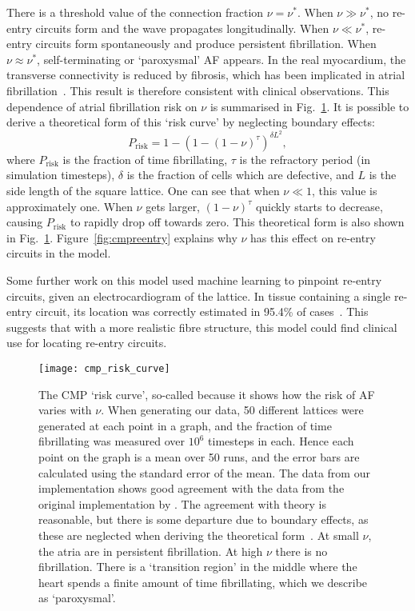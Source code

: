 There is a threshold value of the connection fraction $\nu = \nu^*$. When $\nu \gg \nu^*$, no re-entry circuits form and the wave propagates longitudinally. When $\nu \ll \nu^*$, re-entry circuits form spontaneously and produce persistent fibrillation. When $\nu \approx \nu^*$, self-terminating or `paroxysmal' AF appears. In the real myocardium, the transverse connectivity is reduced by fibrosis, which has been implicated in atrial fibrillation~\cite{de2011fibrosis}. This result is therefore consistent with clinical observations. This dependence of atrial fibrillation risk on $\nu$ is summarised in Fig.~\ref{fig:cmpriskcurve}. It is possible to derive a theoretical form of this `risk curve' by neglecting boundary effects:
\begin{equation}
    P_\mathrm{risk} = 1 - (1 - (1 - \nu)^\tau)^{\delta L^2},
\end{equation}
where $P_\mathrm{risk}$ is the fraction of time fibrillating, $\tau$ is the refractory period (in simulation timesteps), $\delta$ is the fraction of cells which are defective, and $L$ is the side length of the square lattice. One can see that when $\nu \ll 1$, this value is approximately one. When $\nu$ gets larger, $(1 - \nu)^\tau$ quickly starts to decrease, causing $P_\mathrm{risk}$ to rapidly drop off towards zero. This theoretical form is also shown in Fig.~\ref{fig:cmpriskcurve}. Figure~\ref{fig:cmpreentry} explains why $\nu$ has this effect on re-entry circuits in the model.

Some further work on this model used machine learning to pinpoint re-entry circuits, given an electrocardiogram of the lattice. In tissue containing a single re-entry circuit, its location was correctly estimated in 95.4\% of cases~\cite{mcgillivray2018machine}. This suggests that with a more realistic fibre structure, this model could find clinical use for locating re-entry circuits.

\begin{figure}[h!] \begin{mdframed}
    \centering
    \texttt{[image: cmp\_risk\_curve]}
    \caption[short caption]{The CMP `risk curve', so-called because it shows how the risk of AF varies with $\nu$. When generating our data, 50 different lattices were generated at each point in a graph, and the fraction of time fibrillating was measured over $10^6$ timesteps in each. Hence each point on the graph is a mean over 50 runs, and the error bars are calculated using the standard error of the mean. The data from our implementation shows good agreement with the data from the original implementation by . The agreement with theory is reasonable, but there is some departure due to boundary effects, as these are neglected when deriving the theoretical form~\cite{manani}. 
    At small $\nu$, the atria are in persistent fibrillation. At high $\nu$ there is no fibrillation. There is a `transition region' in the middle where the heart spends a finite amount of time fibrillating, which we describe as `paroxysmal'. }
\label{fig:cmpriskcurve}
\end{mdframed} \end{figure}

